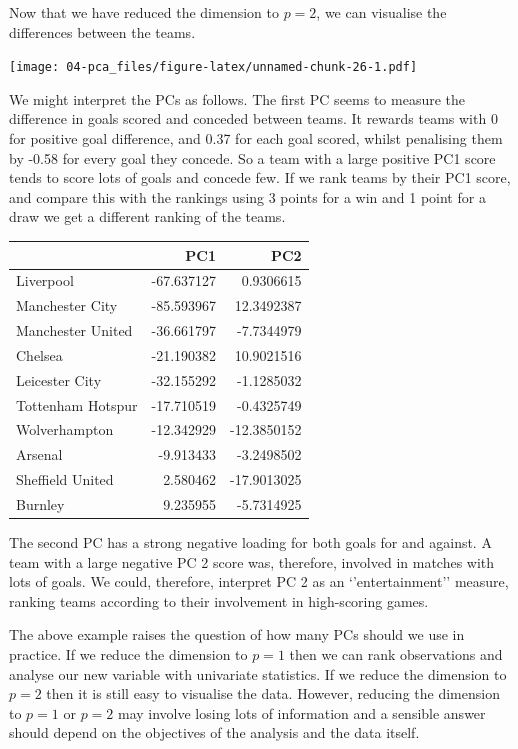 \documentclass[]{book}
\theoremstyle{definition}
\theoremstyle{definition}
\theoremstyle{definition}
\theoremstyle{remark}
\begin{document}
Now that we have reduced the dimension to \(p=2\), we can visualise the differences between the teams.

\texttt{[image: 04-pca\_files/figure-latex/unnamed-chunk-26-1.pdf]}

We might interpret the PCs as follows. The first PC seems to measure the difference in goals scored and conceded between teams. It rewards teams with 0 for positive goal difference, and 0.37 for each goal scored, whilst penalising them by -0.58 for every goal they concede. So a team with a large positive PC1 score tends to score lots of goals and concede few. If we rank teams by their PC1 score, and compare this with the rankings using 3 points for a win and 1 point for a draw we get a different ranking of the teams.

\begin{tabular}{lrr}
\toprule
  & PC1 & PC2\\
\midrule
Liverpool & -67.637127 & 0.9306615\\
Manchester City & -85.593967 & 12.3492387\\
Manchester United & -36.661797 & -7.7344979\\
Chelsea & -21.190382 & 10.9021516\\
Leicester City & -32.155292 & -1.1285032\\
\addlinespace
Tottenham Hotspur & -17.710519 & -0.4325749\\
Wolverhampton & -12.342929 & -12.3850152\\
Arsenal & -9.913433 & -3.2498502\\
Sheffield United & 2.580462 & -17.9013025\\
Burnley & 9.235955 & -5.7314925\\
\bottomrule
\end{tabular}

The second PC has a strong negative loading for both goals for and against. A team with a large negative PC 2 score was, therefore, involved in matches with lots of goals. We could, therefore, interpret PC 2 as an `'entertainment'' measure, ranking teams according to their involvement in high-scoring games.

The above example raises the question of how many PCs should we use in practice. If we reduce the dimension to \(p=1\) then we can rank observations and analyse our new variable with univariate statistics. If we reduce the dimension to \(p=2\) then it is still easy to visualise the data. However, reducing the dimension to \(p=1\) or \(p=2\) may involve losing lots of information and a sensible answer should depend on the objectives of the analysis and the data itself.
\end{document}
